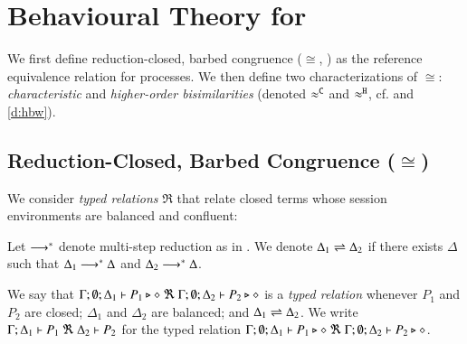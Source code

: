 \documentclass[runningheads]{llncs}
\begin{document}

\section{Behavioural Theory for \HOp}\label{sec:bt}
%

We first define reduction-closed, barbed congruence ($\cong$, ) as the
reference equivalence relation for \HOp processes.
We then define two characterizations of $\cong$:
\emph{characteristic} and
\emph{higher-order bisimilarities}   
 (denoted $\approx^\mathtt{C}$ and $\approx^\mathtt{H}$, cf.  and \ref{d:hbw}). 

\subsection{Reduction-Closed, Barbed Congruence ($\cong$)}
\label{subsec:rc}

We consider \emph{typed relations} $\Re$ that relate  closed terms whose
session environments %
are balanced  and confluent:

\begin{definition}
Let $\longrightarrow^\ast$ denote multi-step reduction as in .
	We denote $\Delta_1 \rightleftharpoons \Delta_2$ if there exists $\Delta$ such that
	$\Delta_1 \longrightarrow^\ast \Delta$ and $\Delta_2 \longrightarrow^\ast \Delta$.
\end{definition}



\begin{definition}
	We say that
	$\Gamma; \emptyset; \Delta_1 \vdash P_1 \triangleright \diamond\ \Re \ \Gamma; \emptyset; \Delta_2 \vdash P_2 \triangleright \diamond$
	is a {\em typed relation} whenever
	$P_1$ and $P_2$ are closed;
	$\Delta_1$ and $\Delta_2$ are balanced; and 
	$\Delta_1 \rightleftharpoons \Delta_2$.
	We write $\horel{\Gamma}{\Delta_1}{P_1}{\ \Re \ }{\Delta_2}{P_2}$
	for the typed relation $\Gamma; \emptyset; \Delta_1 \vdash P_1 \triangleright \diamond\ \Re \ \Gamma; \emptyset; \Delta_2 \vdash P_2 \triangleright \diamond$.
\end{definition}
\end{document}
